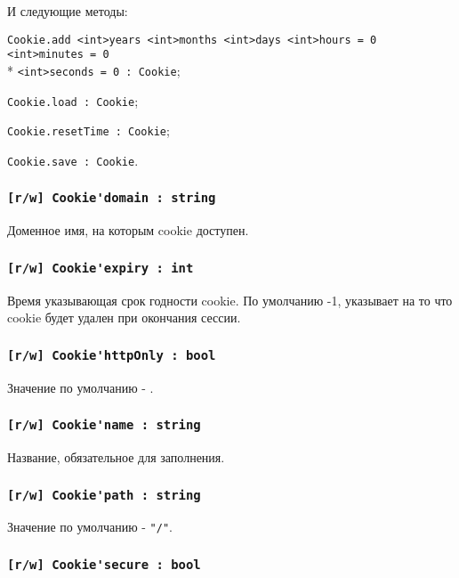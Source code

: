 И следующие методы:
\begin{icItems}
	\item \lstinline|Cookie.add <int>years <int>months <int>days <int>hours = 0 <int>minutes = 0|\\* \lstinline|<int>seconds = 0 : Cookie|;
	\item \lstinline|Cookie.load : Cookie|;
	\item \lstinline|Cookie.resetTime : Cookie|;
	\item \lstinline|Cookie.save : Cookie|.
\end{icItems}

\subsubsection{\lstinline|[r/w] Cookie'domain : string|}

Доменное имя, на которым cookie доступен.

\subsubsection{\lstinline|[r/w] Cookie'expiry : int|}

Время указывающая срок годности cookie. По умолчанию -1, указывает на то что cookie будет удален при окончания сессии.

\subsubsection{\lstinline|[r/w] Cookie'httpOnly : bool|}

Значение по умолчанию - \false.

\subsubsection{\lstinline|[r/w] Cookie'name : string|}

Название, обязательное для заполнения.

\subsubsection{\lstinline|[r/w] Cookie'path : string|}

Значение по умолчанию - \lstinline|"/"|.

\subsubsection{\lstinline|[r/w] Cookie'secure : bool|}

